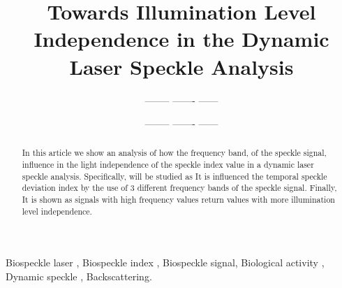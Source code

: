 \documentclass[review]{elsarticle}
\begin{document}
 

\begin{frontmatter}

\title{Towards Illumination Level Independence in the Dynamic Laser Speckle Analysis}



\author{-------- ------- ------}
\author{-------- ------- ------}





\begin{abstract}
In this article we show an analysis of how the frequency band,
of the speckle signal, influence in the
light independence of the speckle index value in a dynamic laser speckle analysis. 
Specifically, 
will be studied as It is influenced the temporal speckle deviation 
index by the use of 3 different frequency bands of the speckle signal.
Finally, It is shown as signals with high frequency values
return values with more illumination level independence.
\end{abstract}

\begin{keyword}
Biospeckle laser \sep 
Biospeckle index \sep 
Biospeckle signal\sep 
Biological activity \sep
Dynamic speckle \sep  
Backscattering.
\end{keyword}

\end{frontmatter}

\linenumbers

\end{document}
